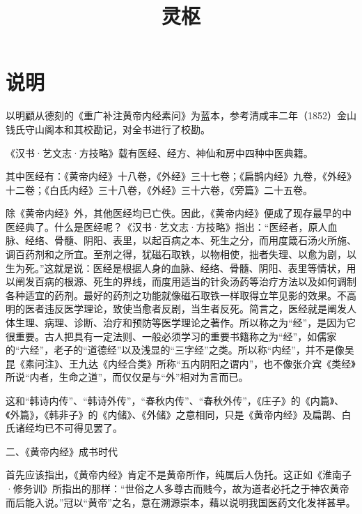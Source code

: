 \documentclass[a4paper,12pt,UTF8,twoside]{ctexbook}
\title{\heiti\zihao{0} 灵枢}
\date{}
\begin{document}
	\maketitle
	
	\tableofcontents
	
	\frontmatter
	\chapter{说明}
	以明顧从德刻的《重广补注黄帝内经素问》为蓝本，参考清咸丰二年（1852）金山钱氏守山阁本和其校勘记，对全书进行了校勘。
	
		《汉书·艺文志·方技略》载有医经、经方、神仙和房中四种中医典籍。
	
	其中医经有：《黄帝内经》十八卷，《外经》三十七卷；《扁鹊内经》九卷，《外经》十二卷；《白氏内经》三十八卷，《外经》三十六卷，《旁篇》二十五卷。
	
	除《黄帝内经》外，其他医经均已亡佚。因此，《黄帝内经》便成了现存最早的中医经典了。什么是医经呢？《汉书·艺文志·方技略》指出：“医经者，原人血脉、经络、骨髓、阴阳、表里，以起百病之本、死生之分，而用度箴石汤火所施、调百药剂和之所宜。至剂之得，犹磁石取铁，以物相使，拙者失理、以愈为剧，以生为死。”这就是说：医经是根据人身的血脉、经络、骨髓、阴阳、表里等情状，用以阐发百病的根源、死生的界线，而度用适当的针灸汤药等治疗方法以及如何调制各种适宜的药剂。最好的药剂之功能就像磁石取铁一样取得立竿见影的效果。不高明的医者违反医学理论，致使当愈者反剧，当生者反死。简言之，医经就是阐发人体生理、病理、诊断、治疗和预防等医学理论之著作。所以称之为“经”，是因为它很重要。古人把具有一定法则、一般必须学习的重要书籍称之为“经”，如儒家的“六经”，老子的“道德经”以及浅显的“三字经”之类。所以称“内经”，并不是像吴昆《素问注》、王九达《内经合类》所称“五内阴阳之谓内”，也不像张介宾《类经》所说“内者，生命之道”，而仅仅是与“外”相对为言而已。
	
	这和“韩诗内传”、“韩诗外传”，“春秋内传”、“春秋外传”，《庄子》的《内篇》、《外篇》，《韩非子》的《内储》、《外储》之意相同，只是《黄帝内经》及扁鹊、白氏诸经均已不可得见罢了。
	
	二、《黄帝内经》成书时代
	
	首先应该指出，《黄帝内经》肯定不是黄帝所作，纯属后人伪托。这正如《淮南子·修务训》所指出的那样：“世俗之人多尊古而贱今，故为道者必托之于神农黄帝而后能入说。”冠以“黄帝”之名，意在溯源崇本，藉以说明我国医药文化发祥甚早。
	
\end{document}
